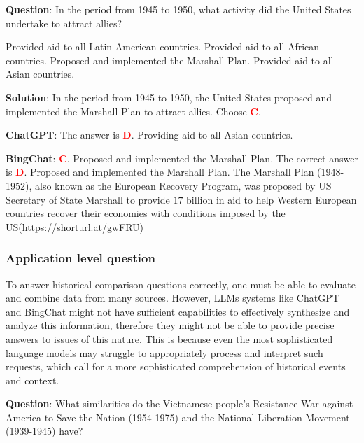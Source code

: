 \documentclass{article}
\begin{document}
{	
	
	\begin{mdframed}[linewidth=1pt,linecolor=red] \textbf{Question}: In the period from 1945 to 1950, what activity did the United States undertake to attract allies?
		
		\begin{choices}
			\choice Provided aid to all Latin American countries.
			\choice Provided aid to all African countries.
			\choice Proposed and implemented the Marshall Plan.
			\choice Provided aid to all Asian countries.
		\end{choices}
		
		\textbf{Solution}: In the period from 1945 to 1950, the United States proposed and implemented the Marshall Plan to attract allies. Choose \textcolor{red}{\textbf{C}}.
		
		\textbf{ChatGPT}: The answer is \textcolor{red}{\textbf{D}}. Providing aid to all Asian countries.
		
		\textbf{BingChat}: \textcolor{red}{\textbf{C}}. Proposed and implemented the Marshall Plan.
		The correct answer is \textcolor{red}{\textbf{D}}. Proposed and implemented the Marshall Plan. The Marshall Plan (1948-1952), also known as the European Recovery Program, was proposed by US Secretary of State Marshall to provide $17$ billion in aid to help Western European countries recover their economies with conditions imposed by the US(\url{https://shorturl.at/gwFRU})
		
	\end{mdframed}
	
	\subsubsection{Application level question}
	\label{VNHSGE_His_A}
	
	To answer historical comparison questions correctly, one must be able to evaluate and combine data from many sources. However, LLMs systems like ChatGPT and BingChat might not have sufficient capabilities to effectively synthesize and analyze this information, therefore they might not be able to provide precise answers to issues of this nature. This is because even the most sophisticated language models may struggle to appropriately process and interpret such requests, which call for a more sophisticated comprehension of historical events and context.
	
	
	
	\begin{mdframed}[linewidth=1pt,linecolor=red] \textbf{Question}: What similarities do the Vietnamese people's Resistance War against America to Save the Nation (1954-1975) and the National Liberation Movement (1939-1945) have? 
		

\end{mdframed}}
\end{document}
